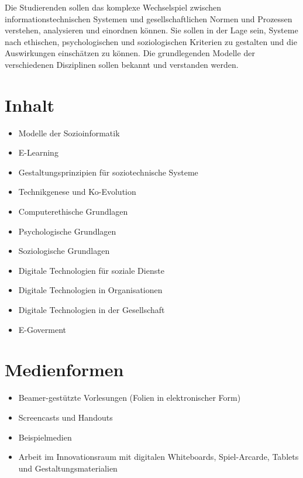 Die Studierenden sollen das komplexe Wechselspiel zwischen
informationstechnischen Systemen und gesellschaftlichen Normen und
Prozessen verstehen, analysieren und einordnen können. Sie sollen in der
Lage sein, Systeme nach ethischen, psychologischen und soziologischen
Kriterien zu gestalten und die Auswirkungen einschätzen zu können. Die
grundlegenden Modelle der verschiedenen Disziplinen sollen bekannt und
verstanden werden.

\hypertarget{inhaltpathlabelmi-2017modulbeschreibungen-bachelorba_sc_soziotechnische-systeme}{%
\section*{Inhalt\label{/mi-2017/modulbeschreibungen-bachelor/BA_SC_soziotechnische-systeme}}\label{inhaltpathlabelmi-2017modulbeschreibungen-bachelorba_sc_soziotechnische-systeme}}

\begin{itemize}
\tightlist
\item
  Modelle der Sozioinformatik
\item
  E-Learning
\item
  Gestaltungsprinzipien für soziotechnische Systeme
\item
  Technikgenese und Ko-Evolution
\item
  Computerethische Grundlagen
\item
  Psychologische Grundlagen
\item
  Soziologische Grundlagen
\item
  Digitale Technologien für soziale Dienste
\item
  Digitale Technologien in Organisationen
\item
  Digitale Technologien in der Gesellschaft
\item
  E-Goverment
\end{itemize}

\hypertarget{medienformenpathlabelmi-2017modulbeschreibungen-bachelorba_sc_soziotechnische-systeme}{%
\section*{Medienformen\label{/mi-2017/modulbeschreibungen-bachelor/BA_SC_soziotechnische-systeme}}\label{medienformenpathlabelmi-2017modulbeschreibungen-bachelorba_sc_soziotechnische-systeme}}

\begin{itemize}
\tightlist
\item
  Beamer-gestützte Vorlesungen (Folien in elektronischer Form)
\item
  Screencasts und Handouts
\item
  Beispielmedien
\item
  Arbeit im Innovationsraum mit digitalen Whiteboards, Spiel-Arcarde,
  Tablets und Gestaltungsmaterialien
\end{itemize}

